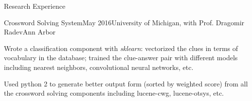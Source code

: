 \documentclass{resume} %
\begin{document}
\begin{rSection}{Research Experience}
	\begin{rSubsection}{Crossword Solving System}{May 2016}{University of Michigan, with Prof. Dragomir Radev}{Ann Arbor}
	\item Wrote a classification component with \textit{sklearn}: vectorized the clues in terms of vocabulary in the database; trained the clue-answer pair with different models including nearest neighbors, convolutional neural networks, etc.
	\item Used python 2 to generate better output form (sorted by weighted score) from all the crossword solving components including lucene-cwg, lucene-otsys, etc.
	\end{rSubsection}
\end{rSection}
%
%	
%	
%	
%	
%	
%		
\end{document}
